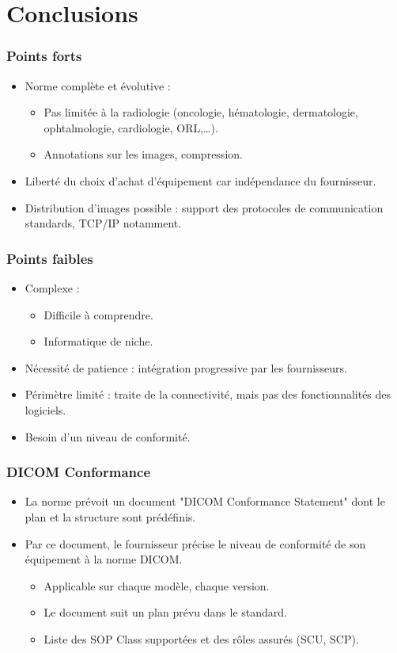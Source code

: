 \section{Conclusions}

\frame
{
	\frametitle{Points forts}
	\begin{itemize}
		\item Norme compl\`ete et \'evolutive :
		\begin{itemize}
			\item Pas limit\'ee \`a la radiologie (oncologie, h\'ematologie, dermatologie, ophtalmologie, cardiologie, ORL,\ldots).
			\item Annotations sur les images, compression.
		\end{itemize}
		\item Libert\'e du choix d'achat d'\'equipement car ind\'ependance du fournisseur.
		\item Distribution d'images possible : support des protocoles de communication standards, TCP/IP notamment.
	\end{itemize}
}

\frame
{
	\frametitle{Points faibles}
	\begin{itemize}
		\item Complexe :
		\begin{itemize}
			\item Difficile \`a comprendre.
			\item Informatique de niche.
		\end{itemize}
		\item N\'ecessit\'e de patience : int\'egration progressive par les fournisseurs.
		\item P\'erim\`etre limit\'e : traite de la connectivit\'e, mais pas des fonctionnalit\'es des logiciels.
		\item Besoin d'un niveau de conformit\'e.
	\end{itemize}
}

\frame
{
	\frametitle{DICOM Conformance}
	\begin{itemize}
		\item La norme pr\'evoit un document "DICOM Conformance Statement" dont le plan et la structure sont pr\'ed\'efinis.
		\item Par ce document, le fournisseur pr\'ecise le niveau de conformit\'e de son \'equipement \`a la norme DICOM.
		\begin{itemize}
			\item Applicable sur chaque mod\`ele, chaque version.
			\item Le document suit un plan pr\'evu dans le standard.
			\item Liste des SOP Class support\'ees et des r\^oles assur\'es (SCU, SCP).
		\end{itemize}
	\end{itemize}
}

